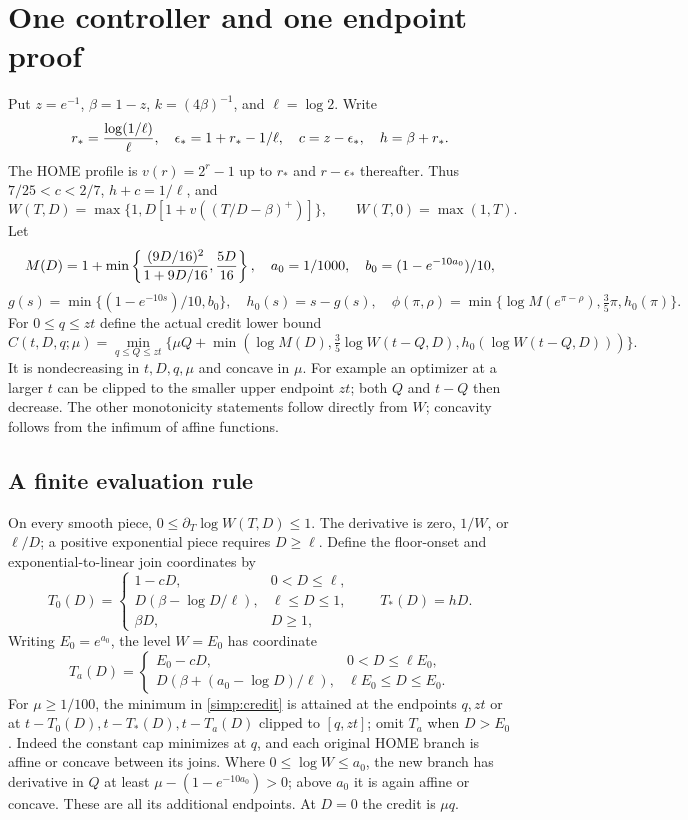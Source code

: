 \section{One controller and one endpoint proof}
\label{simp:controller-section}

Put $z=e^{-1}$, $\beta=1-z$, $k=(4\beta)^{-1}$, and $\ell=\log2$.
Write
\[
 r_*={\log(1/\ell)\over\ell},\quad
 \epsilon_*=1+r_*-1/\ell,\quad c=z-\epsilon_*,\quad h=\beta+r_*.
\]
The HOME profile is $v(r)=2^r-1$ up to $r_*$ and $r-\epsilon_*$
thereafter.  Thus $7/25<c<2/7$, $h+c=1/\ell$, and
\[
 W(T,D)=\max\{1,D[1+v((T/D-\beta)^+)]\},\qquad W(T,0)=\max(1,T).
\]
Let
\[
 M(D)=1+\min\left\{{(9D/16)^2\over1+9D/16},{5D\over16}\right\},
 \quad a_0=1/1000,\quad b_0=(1-e^{-10a_0})/10,
\]
\[
 g(s)=\min\{(1-e^{-10s})/10,b_0\},\quad h_0(s)=s-g(s),\quad
 \phi(\pi,\rho)=\min\{\log M(e^{\pi-\rho}),\tfrac35\pi,h_0(\pi)\}.
\]
For $0\le q\le zt$ define the actual credit lower bound
\begin{equation}\label{simp:credit}
 C(t,D,q;\mu)=\min_{q\le Q\le zt}
 \{\mu Q+\min(\log M(D),\tfrac35\log W(t-Q,D),h_0(\log W(t-Q,D)))\}.
\end{equation}
It is nondecreasing in $t,D,q,\mu$ and concave in $\mu$.
For example an optimizer at a larger $t$ can be clipped to the smaller
upper endpoint $zt$; both $Q$ and $t-Q$ then decrease.  The other
monotonicity statements follow directly from $W$; concavity follows from
the infimum of affine functions.

\subsection{A finite evaluation rule}

On every smooth piece, $0\le\partial_T\log W(T,D)\le1$.
The derivative is zero, $1/W$, or $\ell/D$; a positive exponential
piece requires $D\ge\ell$.
Define the floor-onset and exponential-to-linear join coordinates by
\[
 T_0(D)=\begin{cases}
 1-cD,&0<D\le\ell,\\
 D(\beta-\log D/\ell),&\ell\le D\le1,\\
 \beta D,&D\ge1,
 \end{cases}\qquad T_*(D)=hD.
\]
Writing $E_0=e^{a_0}$, the level $W=E_0$ has coordinate
\[
 T_a(D)=\begin{cases}
 E_0-cD,&0<D\le\ell E_0,\\
 D(\beta+(a_0-\log D)/\ell),&\ell E_0\le D\le E_0.
 \end{cases}
\]
For $\mu\ge1/100$, the minimum in \eqref{simp:credit} is attained at
the endpoints $q,zt$ or at $t-T_0(D),t-T_*(D),t-T_a(D)$ clipped to
$[q,zt]$; omit $T_a$ when $D>E_0$.  Indeed the constant cap minimizes
at $q$, and each original HOME branch is affine or concave between its
joins.  Where $0\le\log W\le a_0$, the new branch has derivative in $Q$
at least $\mu-(1-e^{-10a_0})>0$; above $a_0$ it is again affine or
concave.  These are all its additional endpoints.  At $D=0$ the
credit is $\mu q$.

